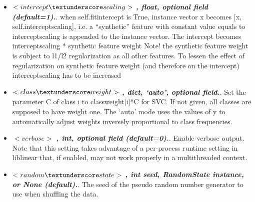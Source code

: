 \begin{itemize}
  \item $<intercept\textunderscore scaling>$ \textbf{\textit{, float, optional field (default=1).}}. when self.fit\textunderscore intercept is True, instance vector x becomes [x, self.intercept\textunderscore scaling], i.e. a “synthetic” feature with constant value equals to intercept\textunderscore scaling is appended to the instance vector. The intercept becomes intercept\textunderscore scaling * synthetic feature weight Note! the synthetic feature weight is subject to l1/l2 regularization as all other features. To lessen the effect of regularization on synthetic feature weight (and therefore on the intercept) intercept\textunderscore scaling has to be increased
  \item $<class\textunderscore weight>$ \textbf{\textit{, {dict, ‘auto’}, optional field.}}. Set the parameter C of class i to class\textunderscore weight[i]*C for SVC. If not given, all classes are supposed to have weight one. The ‘auto’ mode uses the values of y to automatically adjust weights inversely proportional to class frequencies.
  \item $<verbose>$ \textbf{\textit{, int, optional field (default=0).}}. Enable verbose output. Note that this setting takes advantage of a per-process runtime setting in liblinear that, if enabled, may not work properly in a multithreaded context.
  \item $<random\textunderscore state>$ \textbf{\textit{, int seed, RandomState instance, or None (default).}}. The seed of the pseudo random number generator to use when shuffling the data.
\end{itemize}

